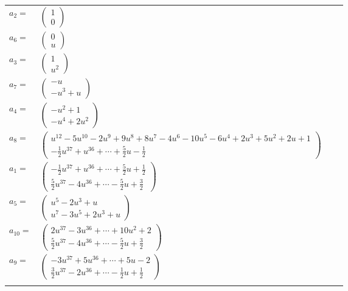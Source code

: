 \documentclass[1p]{elsarticle_modified}
\theoremstyle{definition}
\begin{document}
\begin{tabular}{m{7pt} m{180pt} m{7pt} m{180pt} }
\flushright $a_{2}=$&$\begin{pmatrix}1\\0\end{pmatrix}$ \\
\flushright $a_{6}=$&$\begin{pmatrix}0\\u\end{pmatrix}$ \\
\flushright $a_{3}=$&$\begin{pmatrix}1\\u^2\end{pmatrix}$ \\
\flushright $a_{7}=$&$\begin{pmatrix}- u\\- u^3+u\end{pmatrix}$ \\
\flushright $a_{4}=$&$\begin{pmatrix}- u^2+1\\- u^4+2 u^2\end{pmatrix}$ \\
\flushright $a_{8}=$&$\begin{pmatrix}u^{12}-5 u^{10}-2 u^9+9 u^8+8 u^7-4 u^6-10 u^5-6 u^4+2 u^3+5 u^2+2 u+1\\-\frac{1}{2} u^{37}+u^{36}+\cdots+\frac{5}{2} u-\frac{1}{2}\end{pmatrix}$ \\
\flushright $a_{1}=$&$\begin{pmatrix}-\frac{1}{2} u^{37}+u^{36}+\cdots+\frac{5}{2} u+\frac{1}{2}\\\frac{5}{2} u^{37}-4 u^{36}+\cdots-\frac{5}{2} u+\frac{3}{2}\end{pmatrix}$ \\
\flushright $a_{5}=$&$\begin{pmatrix}u^5-2 u^3+u\\u^7-3 u^5+2 u^3+u\end{pmatrix}$ \\
\flushright $a_{10}=$&$\begin{pmatrix}2 u^{37}-3 u^{36}+\cdots+10 u^2+2\\\frac{5}{2} u^{37}-4 u^{36}+\cdots-\frac{5}{2} u+\frac{3}{2}\end{pmatrix}$ \\
\flushright $a_{9}=$&$\begin{pmatrix}-3 u^{37}+5 u^{36}+\cdots+5 u-2\\\frac{3}{2} u^{37}-2 u^{36}+\cdots-\frac{1}{2} u+\frac{1}{2}\end{pmatrix}$\\&\end{tabular}
\end{document}
